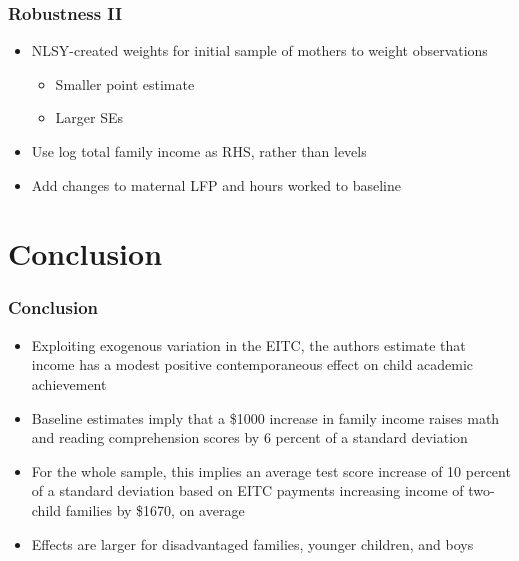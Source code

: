 \documentclass{beamer}
\begin{document}
\begin{frame}
\frametitle{Robustness II}
\begin{itemize}
	\item NLSY-created weights for initial sample of mothers to weight observations
	\begin{itemize}
		\item Smaller point estimate
		\item Larger SEs
	\end{itemize}
	\item Use log total family income as RHS, rather than levels
	\item Add changes to maternal LFP and hours worked to baseline
\end{itemize}
\end{frame}


\section{Conclusion}


\begin{frame}
\frametitle{Conclusion}
\begin{itemize}
	\item Exploiting exogenous variation in the EITC, the authors estimate that income has a modest positive contemporaneous effect on child academic achievement
	\item Baseline estimates imply that a \$1000 increase in family income raises math and reading comprehension scores by 6 percent of a standard deviation
	\item For the whole sample, this implies an average test score increase of 10 percent of a standard deviation based on EITC payments increasing income of two-child families by \$1670, on average
	\item Effects are larger for disadvantaged families, younger children, and boys 
\end{itemize}
\end{frame}

\end{document}
